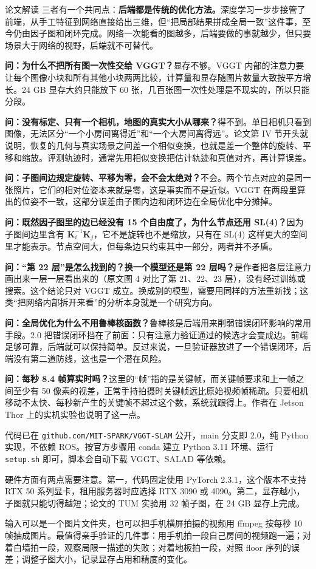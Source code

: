 \begin{interp}{论文解读}
三者有一个共同点：\textbf{后端都是传统的优化方法。}深度学习一步步接管了前端，从手工特征到网络直接给出三维，但“把局部结果拼成全局一致”这件事，至今仍由因子图和闭环完成。网络一次能看的图越多，后端要做的事就越少，但只要场景大于网络的视野，后端就不可替代。


\textbf{问：为什么不把所有图一次性交给 VGGT？}\quad 显存不够。VGGT 内部的注意力要让每个图像小块和所有其他小块两两比较，计算量和显存随图片数量大致按平方增长。24 GB 显存大约只能放下 60 张，几百张图一次性处理是不现实的，所以只能分段。

\textbf{问：没有标定、只有一个相机，地图的真实大小从哪来？}\quad 得不到。单目相机只看到图像，无法区分“一个小房间离得近”和“一个大房间离得远”。论文第 IV 节开头就说明，恢复的几何与真实场景之间差一个相似变换，也就是差一个整体的旋转、平移和缩放。评测轨迹时，通常先用相似变换把估计轨迹和真值对齐，再计算误差。

\textbf{问：子图间边规定旋转、平移为零，会不会太绝对？}\quad 不会。两个节点对应的是同一张照片，它们的相对位姿本来就是零，这是事实而不是近似。VGGT 在两段里算出的位姿不一致，这部分误差由子图内边和闭环边在全局优化中分摊掉。

\textbf{问：既然因子图里的边已经没有 15 个自由度了，为什么节点还用 SL(4)？}\quad 因为子图间边里含有 $\mathbf{K}_i^{-1}\mathbf{K}_j$，它不是旋转也不是缩放，只有在 SL(4) 这样更大的空间里才能表示。节点空间大，但每条边只约束其中一部分，两者并不矛盾。

\textbf{问：“第 22 层”是怎么找到的？换一个模型还是第 22 层吗？}\quad 是作者把各层注意力画出来一层一层看出来的（原文图 4 对比了第 21、22、23 层），没有经过训练或搜索。这个结论只对 VGGT 成立。换成别的模型，需要用同样的方法重新找；这类“把网络内部拆开来看”的分析本身就是一个研究方向。

\textbf{问：全局优化为什么不用鲁棒核函数？}\quad 鲁棒核是后端用来削弱错误闭环影响的常用手段。2.0 把错误闭环挡在了前面：只有注意力验证通过的候选才会变成边。前端足够可靠，后端就可以保持简单。反过来说，一旦验证器放进了一个错误闭环，后端没有第二道防线，这也是一个潜在风险。

\textbf{问：每秒 8.4 帧算实时吗？}\quad 这里的“帧”指的是关键帧，而关键帧要求和上一帧之间至少有 50 像素的视差，正常手持拍摄时关键帧远比原始视频帧稀疏。只要相机移动不太快、每秒新产生的关键帧不超过这个数，系统就跟得上。作者在 Jetson Thor 上的实机实验也说明了这一点。


代码已在 \texttt{github.com/MIT-SPARK/VGGT-SLAM} 公开，main 分支即 2.0，纯 Python 实现，不依赖 ROS。按官方步骤用 conda 建立 Python 3.11 环境、运行 \texttt{setup.sh} 即可，脚本会自动下载 VGGT、SALAD 等依赖。

硬件方面有两点需要注意。第一，代码固定使用 PyTorch 2.3.1，这个版本不支持 RTX 50 系列显卡，租用服务器时应选择 RTX 3090 或 4090。第二，显存越小，子图就只能切得越短；论文的 TUM 实验用 32 帧子图，在 24 GB 显存上完成。

输入可以是一个图片文件夹，也可以把手机横屏拍摄的视频用 ffmpeg 按每秒 10 帧抽成图片。最值得亲手验证的几件事：用手机拍一段自己房间的视频跑一遍；对着白墙拍一段，观察局限一描述的失败；对着地板拍一段，对照 floor 序列的误差；调整子图大小，记录显存占用和精度的变化。

\end{interp}
